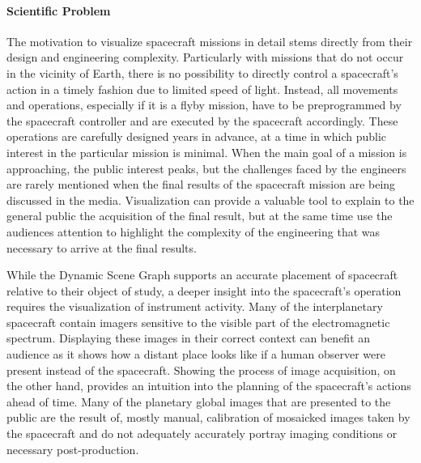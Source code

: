 \paragraph{Scientific Problem} \label{contributions:astro:gb:problem}
The motivation to visualize spacecraft missions in detail stems directly from their design and engineering complexity.  Particularly with missions that do not occur in the vicinity of Earth, there is no possibility to directly control a spacecraft's action in a timely fashion due to limited speed of light.  Instead, all movements and operations, especially if it is a flyby mission, have to be preprogrammed by the spacecraft controller and are executed by the spacecraft accordingly.  These operations are carefully designed years in advance, at a time in which public interest in the particular mission is minimal.  When the main goal of a mission is approaching, the public interest peaks, but the challenges faced by the engineers are rarely mentioned when the final results of the spacecraft mission are being discussed in the media.  Visualization can provide a valuable tool to explain to the general public the acquisition of the final result, but at the same time use the audiences attention to highlight the complexity of the engineering that was necessary to arrive at the final results.

While the Dynamic Scene Graph supports an accurate placement of spacecraft relative to their object of study, a deeper insight into the spacecraft's operation requires the visualization of instrument activity.  Many of the interplanetary spacecraft contain imagers sensitive to the visible part of the electromagnetic spectrum.  Displaying these images in their correct context can benefit an audience as it shows how a distant place looks like if a human observer were present instead of the spacecraft.  Showing the process of image acquisition, on the other hand, provides an intuition into the planning of the spacecraft's actions ahead of time.  Many of the planetary global images that are presented to the public are the result of, mostly manual, calibration of mosaicked images taken by the spacecraft and do not adequately accurately portray imaging conditions or necessary post-production.

